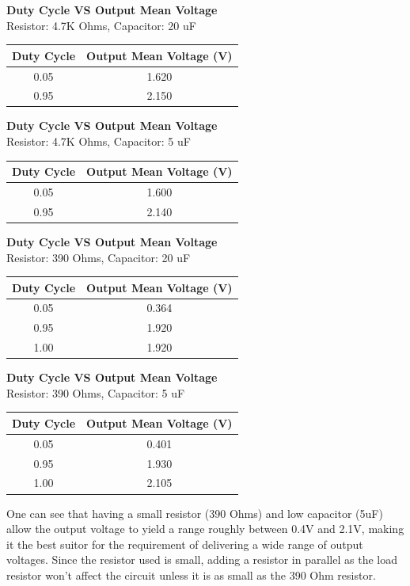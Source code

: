 \documentclass[12pt]{report}
\begin{document}
\textbf{Duty Cycle VS Output Mean Voltage}\\
	Resistor: 4.7K Ohms, Capacitor: 20 uF
	\begin{tabular}{|c|c|}
		\hline
		Duty Cycle & Output Mean Voltage (V)\\\hline
		0.05 & 1.620\\\hline
		0.95 & 2.150\\\hline
	\end{tabular}
	\newline
\textbf{Duty Cycle VS Output Mean Voltage}\\
	Resistor: 4.7K Ohms, Capacitor: 5 uF
	\begin{tabular}{|c|c|}
		\hline
		Duty Cycle & Output Mean Voltage (V)\\\hline
		0.05 & 1.600\\\hline
		0.95 & 2.140\\\hline
	\end{tabular}
	\newline
\textbf{Duty Cycle VS Output Mean Voltage}\\
	Resistor: 390 Ohms, Capacitor: 20 uF
	\begin{tabular}{|c|c|}
		\hline
		Duty Cycle & Output Mean Voltage (V)\\\hline
		0.05 & 0.364	\\\hline
		0.95 & 1.920\\\hline
		1.00 & 1.920\\\hline
	\end{tabular}
	\newline
\textbf{Duty Cycle VS Output Mean Voltage}\\
	Resistor: 390 Ohms, Capacitor: 5 uF
	\begin{tabular}{|c|c|}
		\hline
		Duty Cycle & Output Mean Voltage (V)\\\hline
		0.05 & 0.401	\\\hline
		0.95 & 1.930\\\hline
		1.00 & 2.105\\\hline
	\end{tabular}
	\newline
One can see that having a small resistor (390 Ohms) and low capacitor (5uF) allow the output voltage to yield a range roughly between 0.4V and 2.1V, making it the best suitor for the requirement of delivering a wide range of output voltages. Since the resistor used is small, adding a resistor in parallel as the load resistor won't affect the circuit unless it is as small as the 390 Ohm resistor.
\end{document}
